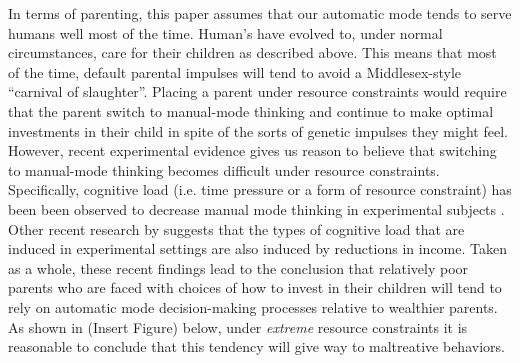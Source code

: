 \documentclass[1p, review]{elsarticle}\usepackage[]{graphicx}\usepackage[]{color}
\begin{document}
In terms of parenting, this paper assumes that our automatic mode tends to serve humans well most of the time. Human's have evolved to, under normal circumstances, care for their children as described above. This means that most of the time, default parental impulses will tend to avoid a Middlesex-style ``carnival of slaughter''. Placing a parent under resource constraints would require that the parent switch to manual-mode thinking and continue to make optimal investments in their child in spite of the sorts of genetic impulses they might feel. However, recent experimental evidence gives us reason to believe that switching to manual-mode thinking becomes difficult under resource constraints. Specifically, cognitive load (i.e. time pressure or a form of resource constraint) has been been observed to decrease manual mode thinking in experimental subjects \citep{Suter2011, Paxton2012}. Other recent research by \citet{Mani2013} suggests that the types of cognitive load that are induced in experimental settings are also induced by reductions in income. Taken as a whole, these recent findings lead to the conclusion that relatively poor parents who are faced with choices of how to invest in their children will tend to rely on automatic mode decision-making processes relative to wealthier parents. As shown in (Insert Figure) below, under \emph{extreme} resource constraints it is reasonable to conclude that this tendency will give way to maltreative behaviors. 
\end{document}
